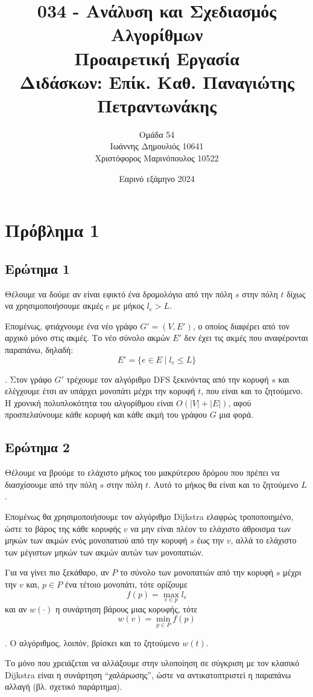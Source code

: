 \documentclass[12pt]{article}
\title{\vspace{-2cm}034 - Ανάλυση και Σχεδιασμός Αλγορίθμων\\ 
         Προαιρετική Εργασία \\
         \large Διδάσκων: Επίκ. Καθ. Παναγιώτης Πετραντωνάκης}
\author{Ομάδα 54 \\
        Ιωάννης Δημουλιός 10641 \\
        Χριστόφορος Μαρινόπουλος 10522}
\date{Εαρινό εξάμηνο 2024}
\begin{document}
\maketitle

\section*{Πρόβλημα 1}
\subsection*{Ερώτημα 1}
Θέλουμε να δούμε αν είναι εφικτό ένα δρομολόγιο από την πόλη \(s\) στην πόλη \(t\) δίχως να χρησιμοποιήσουμε ακμές \(e\) με μήκος \(l_e > L\). 

Επομένως, φτιάχνουμε ένα νέο γράφο \(G' = (V, E')\), ο οποίος διαφέρει από τον αρχικό μόνο στις ακμές. Το νέο σύνολο ακμών \(E'\) δεν έχει τις ακμές που αναφέρονται παραπάνω, δηλαδή: 
\[
    E' = \{e \in E \mid l_e \leq L\}
\]

. Στον γράφο \(G'\) τρέχουμε τον αλγόριθμο DFS ξεκινόντας από την κορυφή \(s\) και ελέγχουμε έτσι αν υπάρχει μονοπάτι μέχρι την κορυφή \(t\), που είναι και το ζητούμενο. 
Η χρονική πολυπλοκότητα του αλγορίθμου είναι \(O(|V| + |E|)\), αφού προσπελαύνουμε κάθε κορυφή και κάθε ακμή του γράφου \(G\) μια φορά. \hfill \blacksquare

\subsection*{Ερώτημα 2}
Θέλουμε να βρούμε το ελάχιστο μήκος του μακρύτερου δρόμου που πρέπει να διασχίσουμε από την πόλη \(s\) στην πόλη \(t\). Αυτό το μήκος θα είναι και το ζητούμενο \(L\). 

Επομένως θα χρησιμοποιήσουμε τον αλγόριθμο Dijkstra ελαφρώς τροποποιημένο, ώστε το βάρος της κάθε κορυφής \(v\) να μην είναι πλέον το ελάχιστο άθροισμα των μηκών των ακμών ενός μονοπατιού από την κορυφή \(s\) έως την \(v\), αλλά το ελάχιστο των μέγιστων μηκών των ακμών αυτών των μονοπατιών. 

Για να γίνει πιο ξεκάθαρο, αν \(P\) το σύνολο των μονοπατιών από την κορυφή \(s\) μέχρι την \(v\) και, \(p \in P\) ένα τέτοιο μονοπάτι, τότε ορίζουμε
\[
    f(p) = \max_{e\in p} l_e
\]
και αν \(w(\cdot)\) η συνάρτηση βάρους μιας κορυφής, τότε 
\[
    w(v) = \min_{p\in P} f(p)
\]

. O αλγόριθμος, λοιπόν, βρίσκει και το ζητούμενο \(w(t)\).

Το μόνο που χρειάζεται να αλλάξουμε στην υλοποίηση σε σύγκριση με τον κλασικό Dijkstra είναι η συνάρτηση ``χαλάρωσης'', ώστε να αντικατοπτριστεί η παραπάνω αλλαγή (βλ. σχετικό παράρτημα). 
\end{document}
